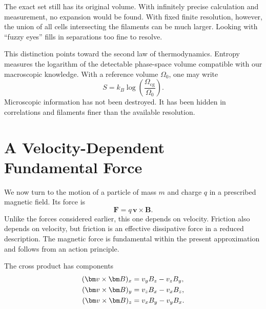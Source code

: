 The exact set still has its original volume. With infinitely precise
calculation and measurement, no expansion would be found. With fixed finite
resolution, however, the union of all cells intersecting the filaments can be
much larger. Looking with ``fuzzy eyes'' fills in separations too fine to
resolve.

\begin{classroomqa}
\end{classroomqa}

This distinction points toward the second law of thermodynamics. Entropy
measures the logarithm of the detectable phase-space volume compatible with
our macroscopic knowledge. With a reference volume \(\Omega_0\), one may write
\begin{equation}
 S=k_B\log\!\left(\frac{\Omega_{\mathrm{cg}}}{\Omega_0}\right).
 \label{eq:l07-coarse-entropy}
\end{equation}
Microscopic information has not been destroyed. It has been hidden in
correlations and filaments finer than the available resolution.

\section{A Velocity-Dependent Fundamental Force}

We now turn to the motion of a particle of mass \(m\) and charge \(q\) in a
prescribed magnetic field. Its force is
\begin{equation}
 \boxed{\bm F=q\,\bm v\times\bm B.}
 \label{eq:l07-lorentz-force}
\end{equation}
Unlike the forces considered earlier, this one depends on velocity. Friction
also depends on velocity, but friction is an effective dissipative force in a
reduced description. The magnetic force is fundamental within the present
approximation and follows from an action principle.

The cross product has components
\begin{align}
 (\bm v\times\bm B)_x&=v_yB_z-v_zB_y,\notag\\
 (\bm v\times\bm B)_y&=v_zB_x-v_xB_z,\notag\\
 (\bm v\times\bm B)_z&=v_xB_y-v_yB_x.
 \label{eq:l07-cross-components}
\end{align}

